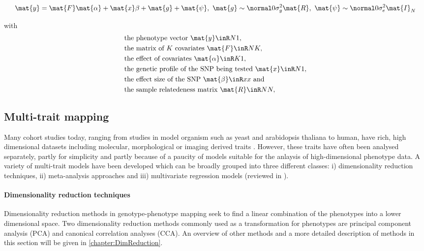 \begin{equation}
\mat{y} =\mat{F}\mat{\alpha} +\mat{x}\beta +\mat{g}+\mat{\psi},\text{ }
\mat{g} \sim \normal 0 {\sigma_g^2\mat{R}},\text{ }
\mat{\psi} \sim\normal 0 {\sigma_e^2\mat{I}_N}
\label{eq:lmm-uv}
\end{equation}

with
\begin{align*} 
& \text{the phenotype vector }\mat{y} \inR N 1,\\
& \text{the matrix of $K$ covariates }\mat{F} \inR N K,\\
& \text{the effect of covariates } \mat{\alpha} \inR K 1,\\
& \text{the genetic profile of the SNP being tested }\mat{x} \inR N 1,\\
& \text{the effect size of the SNP } \mat{\beta} \inR x x \text{ and}\\
& \text{the sample relatedeness matrix }\mat{R} \inR N N,
\end{align*} 


\subsection{Multi-trait mapping}
Many cohort studies today, ranging from studies in model organism such as yeast and arabidopsis thaliana to human, have rich, high dimensional datasets including molecular, morphological or imaging derived traits \citep{Bloom2013,Atwell2010,Astle2009,Shaffer2016,Stein2010}. However, these traits have often been analysed separately,  partly for simplicity and partly because of a paucity of models suitable for the anlaysis of high-dimensional phenotype data. A variety of multi-trait models have been developed which can be broadly grouped into three different classes: i) dimensionality reduction techniques, ii) meta-analysis approaches and iii) multivariate regression models (reviewed in \citep{Shriner2012,Yang2012}). 

\paragraph{Dimensionality reduction techniques} Dimensionality reduction methods in genotype-phenotype mapping seek to find a linear combination of the phenotypes into a lower dimensional space. Two dimensionality reduction methods commonly used as a transformation for phenotypes are principal component analysis (PCA) and canonical correlation analyses (CCA). An overview of other methods and a more detailed description of methods in this section will be given in \cref{chapter:DimReduction}. 

